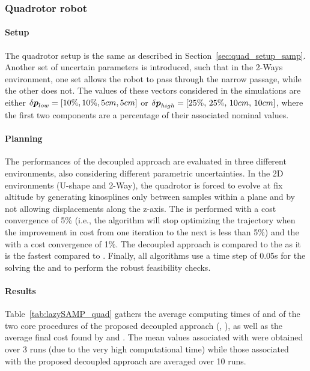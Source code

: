 \subsubsection{Quadrotor robot}

\paragraph{Setup}

The quadrotor setup is the same as described in Section~\ref{sec:quad_setup_samp}.
Another set of uncertain parameters is introduced, such that in the 2-Ways environment, one set allows the robot to pass through the narrow passage, while the other does not.
The values of these vectors considered in the simulations are either $\delta\boldsymbol{p}_{low} = [10\% , 10\% ,  5cm , 5cm]$ or $\delta\boldsymbol{p}_{high} = [25\%, \, 25\%, \, 10cm, \, 10cm]$, where the first two components are a percentage of their associated nominal values. 

\paragraph{Planning}

The performances of the decoupled approach are evaluated in three different environments, also considering different parametric uncertainties.
In the 2D environments (U-shape and 2-Way), the quadrotor is forced to evolve at fix altitude by generating kinosplines only between samples within a plane and by not allowing displacements along the z-axis.
The  is performed with a cost convergence of 5\% (i.e., the algorithm will stop optimizing the trajectory when the improvement in cost from one iteration to the next is less than 5\%) and the  with a cost convergence of 1\%.
The decoupled approach is compared to the  as it is the fastest compared to .
Finally, all algorithms use a time step of 0.05s for the solving the  and to perform the robust feasibility checks.

\paragraph{Results}

Table~\ref{tab:lazySAMP_quad} gathers the average computing times of  and of the two core procedures of the proposed decoupled approach (, ), as well as the average final cost found by  and . 
The mean values associated with  were obtained over 3 runs (due to the very high computational time) while those associated with the proposed decoupled approach are averaged over 10 runs.

